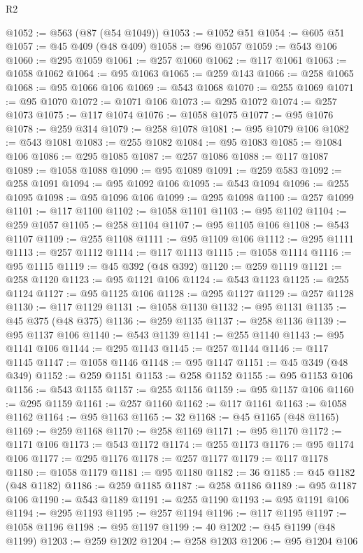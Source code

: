 \begin{lexlean}{R2}
\begin{coremodule}
@1052 := @563 (@87 (@54 @1049))
@1053 := @1052 @51
@1054 := @605 @51
@1057 := @45 @409 (@48 @409)
@1058 := @96 @1057
@1059 := @543 @106
@1060 := @295 @1059
@1061 := @257 @1060
@1062 := @117 @1061
@1063 := @1058 @1062
@1064 := @95 @1063
@1065 := @259 @143
@1066 := @258 @1065
@1068 := @95 @1066 @106
@1069 := @543 @1068
@1070 := @255 @1069
@1071 := @95 @1070
@1072 := @1071 @106
@1073 := @295 @1072
@1074 := @257 @1073
@1075 := @117 @1074
@1076 := @1058 @1075
@1077 := @95 @1076
@1078 := @259 @314
@1079 := @258 @1078
@1081 := @95 @1079 @106
@1082 := @543 @1081
@1083 := @255 @1082
@1084 := @95 @1083
@1085 := @1084 @106
@1086 := @295 @1085
@1087 := @257 @1086
@1088 := @117 @1087
@1089 := @1058 @1088
@1090 := @95 @1089
@1091 := @259 @583
@1092 := @258 @1091
@1094 := @95 @1092 @106
@1095 := @543 @1094
@1096 := @255 @1095
@1098 := @95 @1096 @106
@1099 := @295 @1098
@1100 := @257 @1099
@1101 := @117 @1100
@1102 := @1058 @1101
@1103 := @95 @1102
@1104 := @259 @1057
@1105 := @258 @1104
@1107 := @95 @1105 @106
@1108 := @543 @1107
@1109 := @255 @1108
@1111 := @95 @1109 @106
@1112 := @295 @1111
@1113 := @257 @1112
@1114 := @117 @1113
@1115 := @1058 @1114
@1116 := @95 @1115
@1119 := @45 @392 (@48 @392)
@1120 := @259 @1119
@1121 := @258 @1120
@1123 := @95 @1121 @106
@1124 := @543 @1123
@1125 := @255 @1124
@1127 := @95 @1125 @106
@1128 := @295 @1127
@1129 := @257 @1128
@1130 := @117 @1129
@1131 := @1058 @1130
@1132 := @95 @1131
@1135 := @45 @375 (@48 @375)
@1136 := @259 @1135
@1137 := @258 @1136
@1139 := @95 @1137 @106
@1140 := @543 @1139
@1141 := @255 @1140
@1143 := @95 @1141 @106
@1144 := @295 @1143
@1145 := @257 @1144
@1146 := @117 @1145
@1147 := @1058 @1146
@1148 := @95 @1147
@1151 := @45 @349 (@48 @349)
@1152 := @259 @1151
@1153 := @258 @1152
@1155 := @95 @1153 @106
@1156 := @543 @1155
@1157 := @255 @1156
@1159 := @95 @1157 @106
@1160 := @295 @1159
@1161 := @257 @1160
@1162 := @117 @1161
@1163 := @1058 @1162
@1164 := @95 @1163
@1165 := 32
@1168 := @45 @1165 (@48 @1165)
@1169 := @259 @1168
@1170 := @258 @1169
@1171 := @95 @1170
@1172 := @1171 @106
@1173 := @543 @1172
@1174 := @255 @1173
@1176 := @95 @1174 @106
@1177 := @295 @1176
@1178 := @257 @1177
@1179 := @117 @1178
@1180 := @1058 @1179
@1181 := @95 @1180
@1182 := 36
@1185 := @45 @1182 (@48 @1182)
@1186 := @259 @1185
@1187 := @258 @1186
@1189 := @95 @1187 @106
@1190 := @543 @1189
@1191 := @255 @1190
@1193 := @95 @1191 @106
@1194 := @295 @1193
@1195 := @257 @1194
@1196 := @117 @1195
@1197 := @1058 @1196
@1198 := @95 @1197
@1199 := 40
@1202 := @45 @1199 (@48 @1199)
@1203 := @259 @1202
@1204 := @258 @1203
@1206 := @95 @1204 @106

\end{coremodule}
\end{lexlean}
